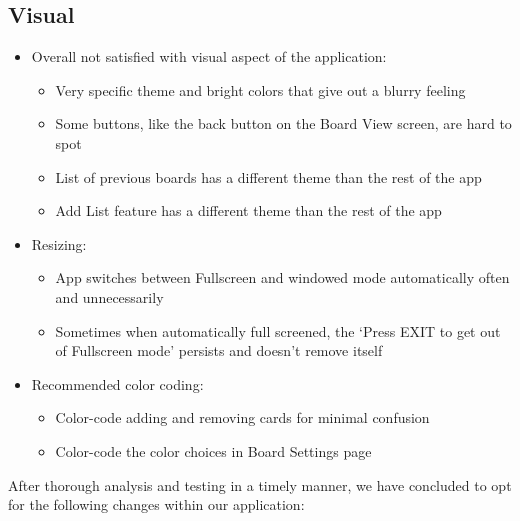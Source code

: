 \subsection{Visual}
\begin{itemize}
    \item Overall not satisfied with visual aspect of the application:
    \begin{itemize}
        \item Very specific theme and bright colors that give out a blurry feeling
        \item Some buttons, like the back button on the Board View screen, are hard to spot
        \item List of previous boards has a different theme than the rest of the app
        \item Add List feature has a different theme than the rest of the app
    \end{itemize}
        \item Resizing:
    \begin{itemize}
        \item App switches between Fullscreen and windowed mode automatically often and unnecessarily
        \item Sometimes when automatically full screened, the ‘Press EXIT to get out of Fullscreen mode’ persists and doesn’t remove itself
    \end{itemize}
        \item Recommended color coding:
    \begin{itemize}
        \item Color-code adding and removing cards for minimal confusion
        \item Color-code the color choices in Board Settings page
    \end{itemize}
\end{itemize}

After thorough analysis and testing in a timely manner, we have concluded to opt for the following changes within our application: